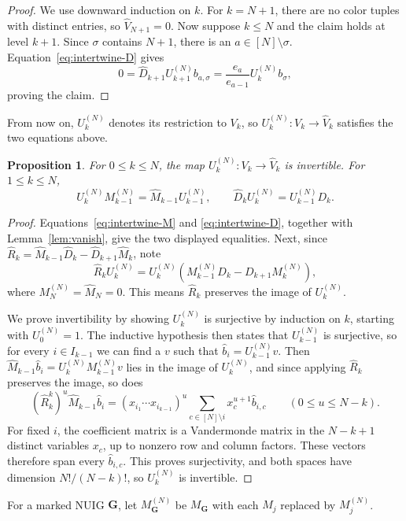 \documentclass[12pt]{article}
\theoremstyle{plain}
\newtheorem{proposition}[theorem]{Proposition}
\theoremstyle{definition}
\theoremstyle{remark}
\newcommand{\bG}{\mathbf{G}}
\begin{document}
\begin{proof}
We use downward induction on $k$. For $k=N+1$, there are no color tuples
with distinct entries, so $\hat V_{N+1}=0$. Now suppose $k\le N$ and
the claim holds at level $k+1$. Since $\sigma$ contains $N+1$, there is
an $a\in[N]\setminus\sigma$. Equation~\eqref{eq:intertwine-D} gives
\[
0=\hat D_{k+1}U_{k+1}^{(N)}b_{a,\sigma}
 =\frac{e_a}{e_{a-1}}U_k^{(N)}b_\sigma,
\]
proving the claim.
\end{proof}

From now on, $U_k^{(N)}$ denotes its restriction to $V_k$, so
$U_k^{(N)}\colon V_k\to\hat V_k$ satisfies the two equations above.

\begin{proposition}\label{prop:finite}
For $0\le k\le N$, the map
$U_k^{(N)}\colon V_k\to\hat V_k$ is invertible. For $1\le k\le N$,
\[
U_k^{(N)}M_{k-1}^{(N)}=\hat M_{k-1}U_{k-1}^{(N)},
\qquad
\hat D_kU_k^{(N)}=U_{k-1}^{(N)}D_k.
\]
\end{proposition}

\begin{proof}
Equations~\eqref{eq:intertwine-M} and \eqref{eq:intertwine-D}, together with
Lemma~\ref{lem:vanish}, give the two displayed equalities. Next, since
$\hat R_k=\hat M_{k-1}\hat D_k-\hat D_{k+1}\hat M_k$, note
\[
\hat R_kU_k^{(N)} = U_k^{(N)}(M_{k-1}^{(N)}D_k-D_{k+1}M_k^{(N)}),
\]
where $M_N^{(N)}=\hat M_N=0$. This means $\hat{R}_k$ preserves the image of $U_k^{(N)}$.

We prove invertibility by showing $U_k^{(N)}$ is surjective by induction on $k$, starting with $U_0^{(N)}=1$. The inductive hypothesis then states that $U_{k-1}^{(N)}$ is surjective, so for every $i\in I_{k-1}$ we can find a $v$ such that $\hat b_i=U_{k-1}^{(N)}v$. Then $\hat M_{k-1}\hat b_i=U_k^{(N)}M_{k-1}^{(N)}v$ lies in the
image of $U_k^{(N)}$, and since applying $\hat{R}_k$ preserves the image, so does
\[
(\hat R_k^{k})^u\hat M_{k-1}\hat b_i
 =(x_{i_1}\cdots x_{i_{k-1}})^u
   \sum_{c\in[N]\setminus i}x_c^{u+1}\hat b_{i,c}
 \qquad(0\le u\le N-k).
\]
For fixed $i$, the coefficient matrix is a Vandermonde matrix in the
$N-k+1$ distinct variables $x_c$, up to nonzero row and column factors.
These vectors therefore span every $\hat b_{i,c}$. This proves
surjectivity, and both spaces have dimension $N!/(N-k)!$, so
$U_k^{(N)}$ is invertible.

\end{proof}

For a marked NUIG $\bG$, let $M_\bG^{(N)}$ be $M_\bG$ with each $M_j$
replaced by $M_j^{(N)}$.
\end{document}
